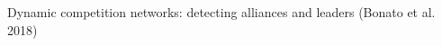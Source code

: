 \documentclass[preview]{standalone}
\begin{document}
Dynamic competition networks: detecting alliances and leaders (Bonato et al. 2018)\\
\end{document}
